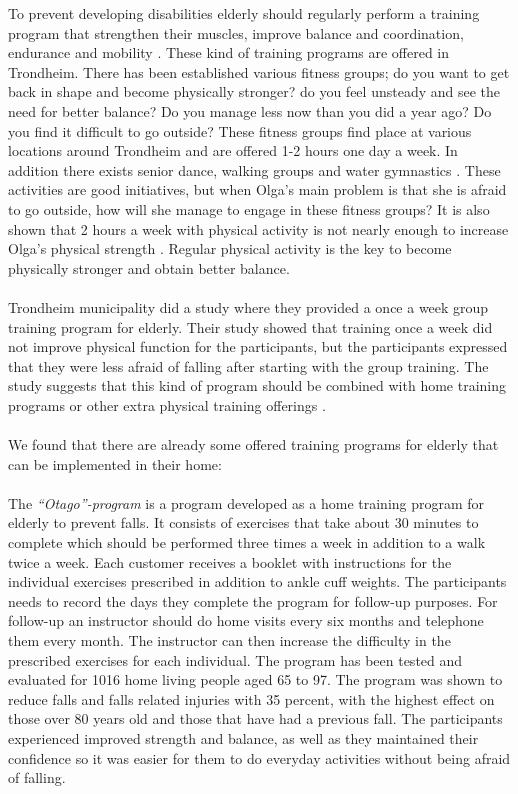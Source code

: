 To prevent developing disabilities elderly should regularly perform a training program that strengthen their muscles, improve balance and coordination, endurance and mobility \cite{gruppetrening-trheim}. These kind of training programs are offered in Trondheim. There has been established various fitness groups; do you want to get back in shape and become physically stronger? do you feel unsteady and see the need for better balance? Do you manage less now than you did a year ago? Do you find it difficult to go outside? These fitness groups find place at various locations around Trondheim and are offered 1-2 hours one day a week. In addition there exists senior dance, walking groups and water gymnastics \cite{trim}. These activities are good initiatives, but when Olga’s main problem is that she is afraid to go outside, how will she manage to engage in these fitness groups? It is also shown that 2 hours a week with physical activity is not nearly enough to increase Olga’s physical strength \cite{gruppetrening-trheim}. Regular physical activity is the key to become physically stronger and obtain better balance. \\ \\
Trondheim municipality did a study where they provided a once a week group training program for elderly. Their study showed that training once a week did not improve physical function for the participants, but the participants expressed that they were less afraid of falling after starting with the group training. The study suggests that this kind of program should be combined with home training programs or other extra physical training offerings \cite{gruppetrening-trheim}. \\ \\
We found that there are already some offered training programs for elderly that can be implemented in their home:\\ \\
The \emph{“Otago”-program} is a program developed as a home training program for elderly to prevent falls. It consists of exercises that take about 30 minutes to complete which should be performed three times a week in addition to a walk twice a week. Each customer receives a booklet with instructions for the individual exercises prescribed in addition to ankle cuff weights. The participants needs to record the days they complete the program for follow-up purposes. For follow-up an instructor should do home visits every six months and telephone them every month. The instructor can then increase the difficulty in the prescribed exercises for each individual. The program has been tested and evaluated for 1016 home living people aged 65 to 97. The program was shown to reduce falls and falls related injuries with 35 percent, with the highest effect on those over 80 years old and those that have had a previous fall. The participants experienced improved strength and balance, as well as they maintained their confidence so it was easier for them to do everyday activities without being afraid of falling. \cite{otago} \cite{gruppetrening-trheim}\\ \\
